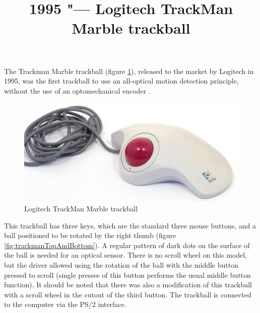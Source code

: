 \documentclass[11pt, a4paper]{article}
\begin{document}
\title{1995 "--- Logitech TrackMan Marble trackball}
\date{}
\maketitle
{}
The Trackman Marble trackball (figure \ref{fig:trackman}), released to the market by Logitech in 1995, was the first trackball to use an all-optical motion detection principle, without the use of an optomechanical encoder \cite{logitech25}.

\begin{figure}[h]
    \centering
    \includegraphics[scale=0.45]{1995_logitech_trackman/pic_60.jpg}
    \caption{Logitech TrackMan Marble trackball}
    \label{fig:trackman}
\end{figure}

This trackball has three keys, which are the standard three mouse buttons, and a ball positioned to be rotated by the right thumb (figure \ref{fig:trackmanTopAndBottom}). A regular pattern of dark dots on the surface of the ball is needed for an optical sensor. There is no scroll wheel on this model, but the driver allowed using the rotation of the ball with the middle button pressed to scroll (single presses of this button performs the usual middle button function). It should be noted that there was also a modification of this trackball with a scroll wheel in the cutout of the third button. The trackball is connected to the computer via the PS/2 interface.
\end{document}

